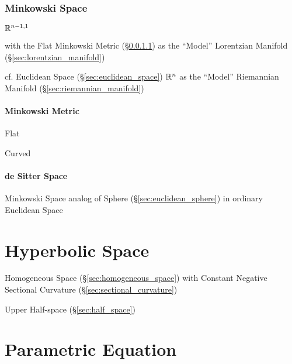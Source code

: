 \subsubsection{Minkowski Space}\label{sec:minkowski_space}

$\mathbb{R}^{n-1,1}$

with the Flat Minkowski Metric (\S\ref{sec:minkowski_metric}) as the
``Model'' Lorentzian Manifold (\S\ref{sec:lorentzian_manifold})

cf. Euclidean Space (\S\ref{sec:euclidean_space}) $\mathbb{R}^n$ as the
``Model'' Riemannian Manifold (\S\ref{sec:riemannian_manifold})



\paragraph{Minkowski Metric}\label{sec:minkowski_metric}\hfill

Flat

Curved



\paragraph{de Sitter Space}\label{sec:desitter_space}\hfill

Minkowski Space analog of Sphere (\S\ref{sec:euclidean_sphere}) in ordinary
Euclidean Space



\section{Hyperbolic Space}\label{sec:hyperbolic_space}

Homogeneous Space (\S\ref{sec:homogeneous_space}) with Constant Negative
Sectional Curvature (\S\ref{sec:sectional_curvature})

Upper Half-space (\S\ref{sec:half_space})



\section{Parametric Equation}\label{sec:parametric_equation}

